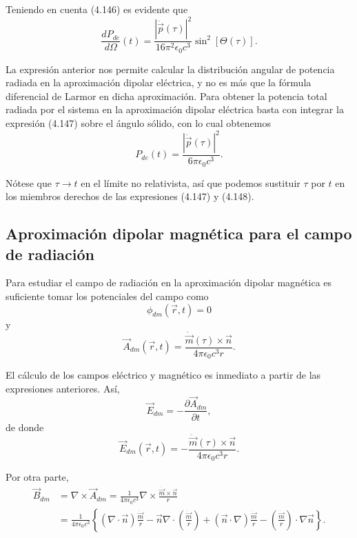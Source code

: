 \documentclass[12pt,a4paper]{book}
\begin{document}
Teniendo en cuenta (4.146) es evidente que
\begin{equation}
\frac{dP_{de}}{d\Omega}(t) = \frac{|\ddot{\vec{p}}(\tau)|^2}{16\pi^2\epsilon_0c^3}\sin^2[\Theta(\tau)].
\end{equation}

La expresión anterior nos permite calcular la distribución angular de potencia radiada en la aproximación dipolar eléctrica, y no es más que la fórmula diferencial de Larmor en dicha aproximación. Para obtener la potencia total radiada por el sistema en la aproximación dipolar eléctrica basta con integrar la expresión (4.147) sobre el ángulo sólido, con lo cual obtenemos
\begin{equation}
P_{de}(t) = \frac{|\ddot{\vec{p}}(\tau)|^2}{6\pi\epsilon_0c^3}.
\end{equation}

Nótese que $\tau \to t$ en el límite no relativista, así que podemos sustituir $\tau$ por $t$ en los miembros derechos de las expresiones (4.147) y (4.148).

\subsection{Aproximación dipolar magnética para el campo de radiación}

Para estudiar el campo de radiación en la aproximación dipolar magnética es suficiente tomar los potenciales del campo como
\begin{equation}
\phi_{dm}(\vec{r}, t) = 0
\end{equation}
y
\begin{equation}
\vec{A}_{dm}(\vec{r}, t) = \frac{\dot{\vec{m}}(\tau) \times \vec{n}}{4\pi\epsilon_0 c^3r}.
\end{equation}

El cálculo de los campos eléctrico y magnético es inmediato a partir de las expresiones anteriores. Así,
\begin{equation}
\vec{E}_{dm} = -\frac{\partial \vec{A}_{dm}}{\partial t},
\end{equation}
de donde
\begin{equation}
\vec{E}_{dm}(\vec{r}, t) = -\frac{\ddot{\vec{m}}(\tau) \times \vec{n}}{4\pi\epsilon_0c^3 r}.
\end{equation}

Por otra parte,
\begin{align}
\vec{B}_{dm} &= \nabla\times \vec{A}_{dm} = \frac{1}{4\pi\epsilon_0 c^3}\nabla\times\frac{\dot{\vec{m}} \times \vec{n}}{r} \nonumber \\
&= \frac{1}{4\pi\epsilon_0 c^3}\left\{(\nabla \cdot \vec{n})\frac{\dot{\vec{m}}}{r} - \vec{n}\nabla \cdot \left(\frac{\dot{\vec{m}}}{r}\right) + (\vec{n} \cdot \nabla)\frac{\dot{\vec{m}}}{r} - \left(\frac{\dot{\vec{m}}}{r}\right) \cdot \nabla\vec{n} \right\}.
\end{align}
\end{document}
